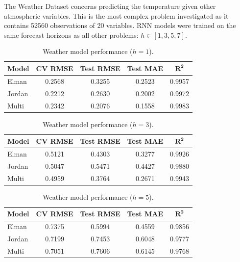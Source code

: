 \documentclass[conference]{IEEEtran}
\begin{document}
The Weather Dataset concerns predicting the temperature given other atmospheric variables. This is the most complex problem investigated as it contains 52560 observations of 20 variables. RNN models were trained on the same forecast horizons as all other problems: $h \in [1,3,5,7]$.

\begin{table}[H]
\centering
\caption{Weather model performance ($h=1$).}
\label{tab:wx_h1}
\begin{tabular}{lcccc}
\toprule
\textbf{Model} & \textbf{CV RMSE} & \textbf{Test RMSE} & \textbf{Test MAE} & $\mathbf{R^2}$ \\
\midrule
Elman  & 0.2568 & 0.3255 & 0.2523 & 0.9957 \\
Jordan & 0.2212 & 0.2630 & 0.2002 & 0.9972 \\
Multi  & 0.2342 & 0.2076 & 0.1558 & 0.9983 \\
\bottomrule
\end{tabular}
\end{table}

\begin{table}[H]
\centering
\caption{Weather model performance ($h=3$).}
\label{tab:wx_h3}
\begin{tabular}{lcccc}
\toprule
\textbf{Model} & \textbf{CV RMSE} & \textbf{Test RMSE} & \textbf{Test MAE} & $\mathbf{R^2}$ \\
\midrule
Elman  & 0.5121 & 0.4303 & 0.3277 & 0.9926 \\
Jordan & 0.5047 & 0.5471 & 0.4427 & 0.9880 \\
Multi  & 0.4959 & 0.3764 & 0.2671 & 0.9943 \\
\bottomrule
\end{tabular}
\end{table}

\begin{table}[H]
\centering
\caption{Weather model performance ($h=5$).}
\label{tab:wx_h5}
\begin{tabular}{lcccc}
\toprule
\textbf{Model} & \textbf{CV RMSE} & \textbf{Test RMSE} & \textbf{Test MAE} & $\mathbf{R^2}$ \\
\midrule
Elman  & 0.7375 & 0.5994 & 0.4559 & 0.9856 \\
Jordan & 0.7199 & 0.7453 & 0.6048 & 0.9777 \\
Multi  & 0.7051 & 0.7606 & 0.6145 & 0.9768 \\
\bottomrule
\end{tabular}
\end{table}
\end{document}
